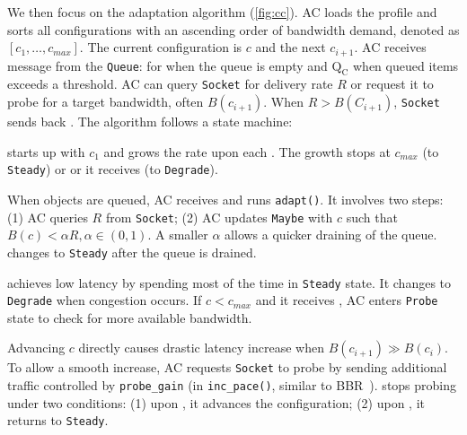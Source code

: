 We then focus on the adaptation algorithm (\autoref{fig:cc}). AC loads the
profile and sorts all configurations with an ascending order of bandwidth
demand, denoted as $[c_1, \dots, c_{max}]$. The current configuration is $c$ and
the next $c_{i+1}$. AC receives message from the \texttt{Queue}: \qe{} for when
the queue is empty and $\text{Q}_\text{C}$ when queued items exceeds a
threshold. AC can query \texttt{Socket} for delivery rate $R$ or request it to
probe for a target bandwidth, often $B(c_{i+1})$. When $R > B(C_{i+1})$,
\texttt{Socket} sends back \spd{}. The algorithm follows a state machine:

 \sysname{} starts up with $c_1$ and grows the rate
upon each \qe{}. The growth stops at $c_{max}$ (to \texttt{Steady}) or or it
receives \qc{} (to \texttt{Degrade}).

 When objects are queued, AC receives
\qc{} and runs \texttt{adapt()}. It involves two steps: (1) AC queries $R$ from
\texttt{Socket}; (2) AC updates \texttt{Maybe} with $c$ such that
$B(c) < \alpha R, \alpha \in (0, 1)$. A smaller $\alpha$ allows a quicker
draining of the queue. \sysname{} changes to \texttt{Steady} after the queue is
drained.

 \sysname{} achieves low latency by spending
most of the time in \texttt{Steady} state. It changes to \texttt{Degrade} when
congestion occurs. If $c < c_{max}$ and it receives \qe{}, AC enters
\texttt{Probe} state to check for more available bandwidth.

 Advancing $c$ directly
causes drastic latency increase when $B(c_{i+1}) \gg B(c_i)$. To allow a smooth
increase, AC requests \texttt{Socket} to probe by sending additional traffic
controlled by \texttt{probe\_gain} (in \texttt{inc\_pace()}, similar to
BBR~\cite{cardwell2017bbr}). \sysname{} stops probing under two conditions: (1)
upon \spd{}, it advances the configuration; (2) upon \qc{}, it returns to
\texttt{Steady}.

